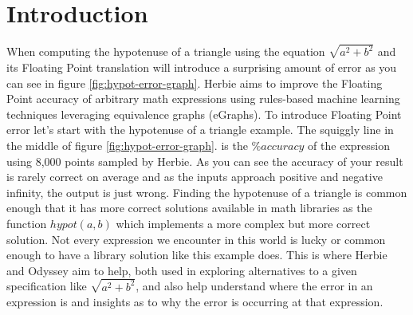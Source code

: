 \documentclass{article}
\begin{document}
\section{Introduction}
When computing the hypotenuse of a triangle using the equation $\sqrt{a^2 + b^2}$ and its Floating Point translation will introduce a surprising amount of error as you can see in figure \ref{fig:hypot-error-graph}. Herbie aims to improve the Floating Point accuracy of arbitrary math expressions using rules-based machine learning techniques leveraging equivalence graphs (eGraphs). To introduce Floating Point error let's start with the hypotenuse of a triangle example. The squiggly line in the middle of figure \ref{fig:hypot-error-graph}.  is the $\%accuracy$ of the expression using 8,000 points sampled by Herbie. As you can see the accuracy of your result is rarely correct on average and as the inputs approach positive and negative infinity, the output is just wrong. Finding the hypotenuse of a triangle is common enough that it has more correct solutions available in math libraries as the function $hypot(a,b)$ which implements a more complex but more correct solution. Not every expression we encounter in this world is lucky or common enough to have a library solution like this example does. This is where Herbie and Odyssey aim to help, both used in exploring alternatives to a given specification like $\sqrt{a^2 + b^2}$, and also help understand where the error in an expression is and insights as to why the error is occurring at that expression.
\end{document}
